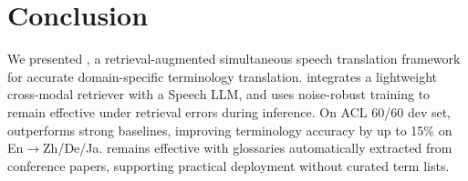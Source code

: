 \section{Conclusion}
We presented \method, a retrieval-augmented simultaneous speech translation framework for accurate domain-specific terminology translation. \method integrates a lightweight cross-modal retriever with a Speech LLM, and uses noise-robust training to remain effective under retrieval errors during inference.
On ACL 60/60 dev set, \method outperforms strong baselines, improving terminology accuracy by up to 15\% on En$\rightarrow$Zh/De/Ja. \method remains effective with glossaries automatically extracted from conference papers, supporting practical deployment without curated term lists. 